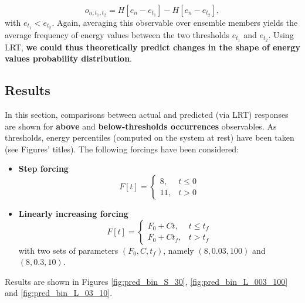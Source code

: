 \documentclass{article}
\begin{document}
\begin{equation}
o_{n, t_1, t_2}=H[e_n - e_{t_1}] - H[e_n - e_{t_2}],
\end{equation}
with $e_{t_1} < e_{t_2}$. Again, averaging this observable over ensemble members yields the average frequency of energy values between the two thresholds $e_{t_1}$ and $e_{t_2}$. Using LRT, \textbf{we could thus theoretically predict changes in the shape of energy values probability distribution}.

\subsection{Results}\label{results}

In this section, comparisons between actual and predicted (via LRT) responses are shown for \textbf{above} and \textbf{below-thresholds occurrences} observables.
As thresholds, energy percentiles (computed on the system at rest) have been taken (see Figures' titles).
The following forcings have been considered:

\begin{itemize}
	\item \textbf{Step forcing}
		\begin{equation}
		F[t]=\left\{\begin{array}{ll}{8,} & {t \leq 0} \\ {11,} & {t > 0}\end{array}\right.
		\end{equation}		
	\item \textbf{Linearly increasing forcing}
		\begin{equation}
		F[t]=\left\{\begin{array}{ll}{F_0 + C t,} & {t \leq t_f} \\ {F_0 + C t_f,} & {t > t_f}\end{array}\right.
		\end{equation}
		with two sets of parameters $(F_0, C, t_f)$, namely $(8, 0.03, 100)$ and $(8, 0.3, 10)$.
\end{itemize}
Results are shown in Figures \ref{fig:pred_bin_S_30}, \ref{fig:pred_bin_L_003_100} and \ref{fig:pred_bin_L_03_10}.
\end{document}
